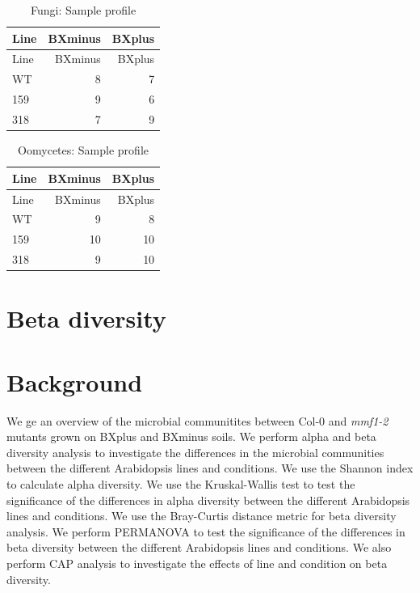 \documentclass[
  11pt,
]{article}
\begin{document}
\begin{longtable}[]{@{}lrr@{}}
\caption{Fungi: Sample profile}\tabularnewline
\toprule\noalign{}
Line & BXminus & BXplus \\
\midrule\noalign{}
\endfirsthead
\toprule\noalign{}
Line & BXminus & BXplus \\
\midrule\noalign{}
\endhead
\bottomrule\noalign{}
\endlastfoot
WT & 8 & 7 \\
159 & 9 & 6 \\
318 & 7 & 9 \\
\end{longtable}

\begin{longtable}[]{@{}lrr@{}}
\caption{Oomycetes: Sample profile}\tabularnewline
\toprule\noalign{}
Line & BXminus & BXplus \\
\midrule\noalign{}
\endfirsthead
\toprule\noalign{}
Line & BXminus & BXplus \\
\midrule\noalign{}
\endhead
\bottomrule\noalign{}
\endlastfoot
WT & 9 & 8 \\
159 & 10 & 10 \\
318 & 9 & 10 \\
\end{longtable}

\section{Beta diversity}\label{beta-diversity}

\section{Background}\label{background-1}

We ge an overview of the microbial communitites between Col-0 and
\emph{mmf1-2} mutants grown on BXplus and BXminus soils. We perform
alpha and beta diversity analysis to investigate the differences in the
microbial communities between the different Arabidopsis lines and
conditions. We use the Shannon index to calculate alpha diversity. We
use the Kruskal-Wallis test to test the significance of the differences
in alpha diversity between the different Arabidopsis lines and
conditions. We use the Bray-Curtis distance metric for beta diversity
analysis. We perform PERMANOVA to test the significance of the
differences in beta diversity between the different Arabidopsis lines
and conditions. We also perform CAP analysis to investigate the effects
of line and condition on beta diversity.
\end{document}
